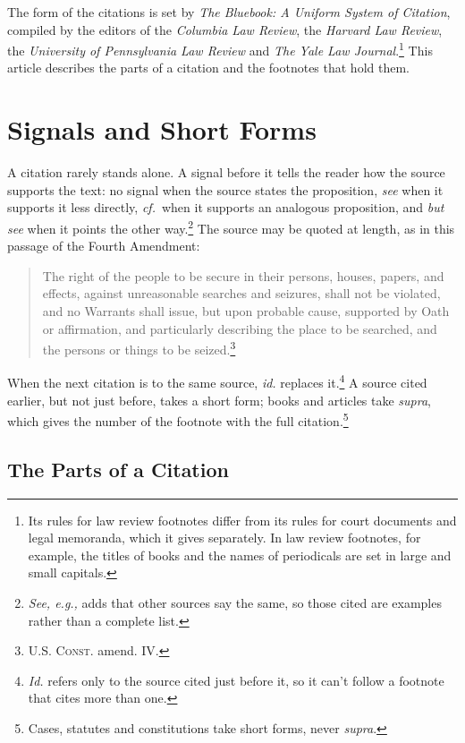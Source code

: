 \documentclass[letterpaper,12pt,twoside]{article}
\begin{document}
The form of the citations is set by \emph{The Bluebook: A Uniform System of Citation}, compiled by the editors of the \emph{Columbia Law Review}, the \emph{Harvard Law Review}, the \emph{University of Pennsylvania Law Review} and \emph{The Yale Law Journal}.\footnote{Its rules for law review footnotes differ from its rules for court documents and legal memoranda, which it gives separately. In law review footnotes, for example, the titles of books and the names of periodicals are set in large and small capitals.} This article describes the parts of a citation and the footnotes that hold them.

\section{Signals and Short Forms}

A citation rarely stands alone. A signal before it tells the reader how the source supports the text: no signal when the source states the proposition, \emph{see} when it supports it less directly, \emph{cf.}\ when it supports an analogous proposition, and \emph{but see} when it points the other way.\footnote{\emph{See, e.g.,} adds that other sources say the same, so those cited are examples rather than a complete list.} The source may be quoted at length, as in this passage of the Fourth Amendment:

	\begin{quote}
		The right of the people to be secure in their persons, houses, papers, and effects, against unreasonable searches and seizures, shall not be violated, and no Warrants shall issue, but upon probable cause, supported by Oath or affirmation, and particularly describing the place to be searched, and the persons or things to be seized.\footnote{U.S. \textsc{Const.} amend. IV.}
	\end{quote}

When the next citation is to the same source, \emph{id.} replaces it.\footnote{\emph{Id.} refers only to the source cited just before it, so it can't follow a footnote that cites more than one.} A source cited earlier, but not just before, takes a short form; books and articles take \emph{supra}, which gives the number of the footnote with the full citation.\footnote{Cases, statutes and constitutions take short forms, never \emph{supra}.}

\subsection{The Parts of a Citation}
\end{document}
